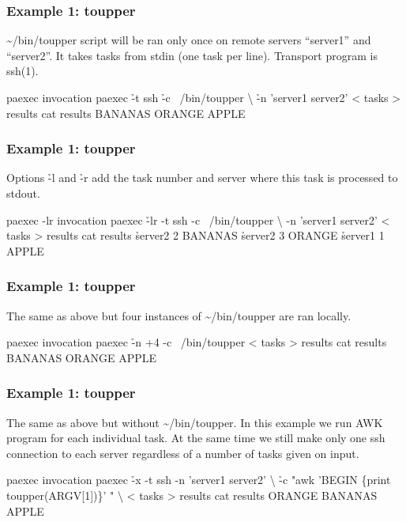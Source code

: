 \documentclass[hyperref={colorlinks=true}]{beamer}
\begin{document}
\begin{frame}[fragile]
  \frametitle{Example 1: toupper}
\~{}/bin/toupper script will be ran only once on remote servers
``server1'' and ``server2''.  It takes tasks from stdin (one task per
line). Transport program is ssh(1).
  \begin{block}{}
      \begin{CodeLarge}{paexec invocation}
\prompt{\$} paexec \h{-t} ssh \h{-c} ~/bin/toupper \textbackslash
   \h{-n} 'server1 server2' < tasks > results
\prompt{\$} cat results
 BANANAS
 ORANGE
 APPLE
\prompt{\$}
      \end{CodeLarge}
  \end{block}
\end{frame}

\begin{frame}[fragile]
  \frametitle{Example 1: toupper}
Options \h{-l} and \h{-r} add the task number and server where this
task is processed to stdout.
  \begin{block}{}
      \begin{CodeLarge}{paexec -lr invocation}
\prompt{\$} paexec \h{-lr} -t ssh -c ~/bin/toupper \textbackslash
   -n 'server1 server2' < tasks > results
\prompt{\$} cat results
\h{server2 2}  BANANAS
\h{server2 3}  ORANGE
\h{server1 1}  APPLE
\prompt{\$}
      \end{CodeLarge}
  \end{block}
\end{frame}


\begin{frame}[fragile]
  \frametitle{Example 1: toupper}
The same as above but four instances of \~{}/bin/toupper are ran locally.
  \begin{block}{}
      \begin{CodeLarge}{paexec invocation}
\prompt{\$} paexec \h{-n} +4 -c ~/bin/toupper
   < tasks > results
\prompt{\$} cat results
BANANAS
ORANGE
APPLE
\prompt{\$}
      \end{CodeLarge}
  \end{block}
\end{frame}


\begin{frame}[fragile]
  \frametitle{Example 1: toupper}
The same as above but without \~{}/bin/toupper.  In this example we
run AWK program for each individual task.  At the same time we still
make only one ssh connection to each server regardless of a number of
tasks given on input.
  \begin{block}{}
      \begin{CodeLarge}{paexec invocation}
\prompt{\$} paexec \h{-x} -t ssh -n 'server1 server2' \textbackslash
\h{-c} "awk 'BEGIN \{print toupper(ARGV[1])\}' " \textbackslash
    < tasks > results
\prompt{\$} cat results
ORANGE
BANANAS
APPLE
\prompt{\$}
      \end{CodeLarge}
  \end{block}
\end{frame}
\end{document}
